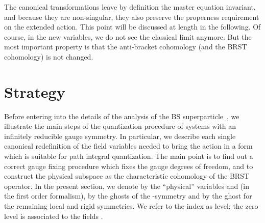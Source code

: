 \documentclass[a4paper,12pt]{article}
\begin{document}
The canonical transformations leave by definition the master equation
invariant, and because they are non-singular, they also preserve the
properness requirement on the extended action. This point will be
discussed at length in the following. Of course, in the new variables,
we do not see the classical limit anymore. But the most important
property is that the anti-bracket cohomology \cite{anti_coho} (and the
BRST cohomology) is not changed.


\section{Strategy} 
\label{sec:strategy}

Before entering into the details of the analysis of the BS
superparticle~\cite{Brink-Schwarz}, we illustrate the main steps of
the quantization procedure of systems with an infinitely reducible gauge
symmetry. In particular, we describe each single canonical
redefinition of the field variables needed to bring the action in a
form which is suitable for path integral quantization. The main point
is to find out a correct gauge fixing procedure which fixes the gauge
degrees of freedom, and to construct the physical subspace as the
characteristic cohomology of the BRST operator.  In the present
section, we denote by \myHighlight{$\Phi$}\coordHE{} the ``physical'' variables
\coordHE{} and \coordHE{} (in the first order formalism), by
\coordHE{} the ghosts of the \myHighlight{$\kappa$}\coordHE{}-symmetry and by \coordHE{} the
ghost for the remaining local and rigid symmetries. We refer to the
index \coordHE{} as level; the zero level is associated to the fields \coordHE{}.
\end{document}
